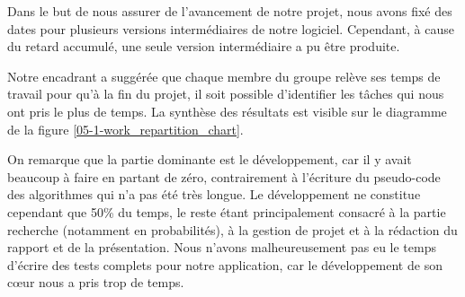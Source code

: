 Dans le but de nous assurer de l'avancement de notre projet, nous avons fixé des dates pour plusieurs versions intermédiaires de notre logiciel. Cependant, à cause du retard accumulé, une seule version intermédiaire a pu être produite.

Notre encadrant a suggérée que chaque membre du groupe relève ses temps de travail pour qu'à la fin du projet, il soit possible d'identifier les tâches qui nous ont pris le plus de temps. La synthèse des résultats est visible sur le diagramme de la figure \ref{05-1-work_repartition_chart}.

On remarque que la partie dominante est le développement, car il y avait beaucoup à faire en partant de zéro, contrairement à l'écriture du pseudo-code des algorithmes qui n'a pas été très longue. Le développement ne constitue cependant que 50\% du temps, le reste étant principalement consacré à la partie recherche (notamment en probabilités), à la gestion de projet et à la rédaction du rapport et de la présentation.
Nous n'avons malheureusement pas eu le temps d'écrire des tests complets pour notre application, car le développement de son cœur nous a pris trop de temps.


